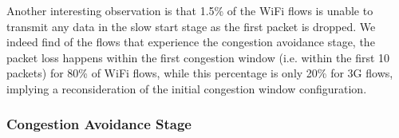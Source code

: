 Another interesting observation is that 1.5\% of the WiFi flows is unable to transmit any data in the slow start stage as the first packet is dropped. We indeed find of the flows that experience the congestion avoidance stage, the packet loss happens within the first congestion window (i.e. within the first 10 packets) for 80\% of WiFi flows, while this percentage is only 20\% for 3G flows, implying a reconsideration of the initial congestion window configuration.


%
%

\subsubsection{Congestion Avoidance Stage}

